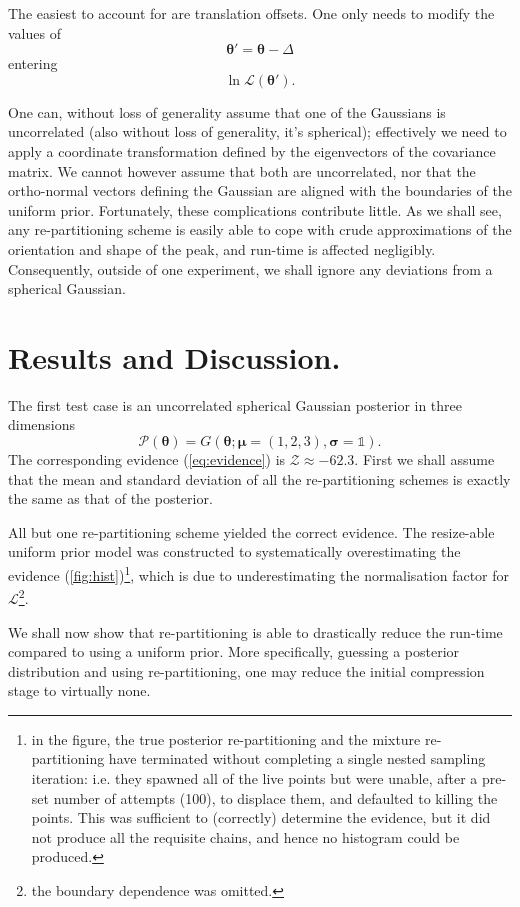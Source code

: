 \documentclass[usenatbib]{mnras}
\begin{document}
The easiest to account for are translation offsets. One only needs
to modify the values of \[\bm{\theta}' = \bm{\theta} - \Delta\] entering
\[\ln \mathcal{L}(\bm{\theta}').\]

One can, without loss of generality assume that one of the
Gaussians is uncorrelated (also without loss of generality, it's
spherical); effectively we need to apply a coordinate
transformation defined by the eigenvectors of the covariance
matrix. We cannot however assume that both are uncorrelated, nor
that the ortho-normal vectors defining the Gaussian are aligned
with the boundaries of the uniform prior. Fortunately, these
complications contribute little. As we shall see, any
re-partitioning scheme is easily able to cope with crude
approximations of the orientation and shape of the peak, and
run-time is affected negligibly. Consequently, outside of one
experiment, we shall ignore any deviations from a spherical
Gaussian.


\section{Results and Discussion.}
\label{sec:orgec40726}
The first test case is an uncorrelated spherical Gaussian posterior
in three dimensions \[\mathcal{P}(\bm{\theta}) = G(\bm{\theta}; \bm{\mu} =
  (1,2,3),\bm{\sigma} = \mathds{1}).\] The corresponding evidence
(\autoref{eq:evidence}) is \(\mathcal{Z}\approx-62.3\). First we shall
assume that the mean and standard deviation of all the
re-partitioning schemes is exactly the same as that of the
posterior.

All but one re-partitioning scheme yielded the correct evidence. The
resize-able uniform prior model was constructed to systematically
overestimating the evidence (\autoref{fig:hist})\footnote{in the figure,
the true posterior re-partitioning and the mixture re-partitioning
have terminated without completing a single nested sampling
iteration: i.e. they spawned all of the live points but were unable,
after a pre-set number of attempts (100), to displace them, and
defaulted to killing the points. This was sufficient to (correctly)
determine the evidence, but it did not produce all the requisite
chains, and hence no histogram could be produced.}, which is due to
underestimating the normalisation factor for
\(\mathcal{L}\)\footnote{the boundary dependence was omitted.}.


We shall now show that re-partitioning is able to drastically reduce
the run-time compared to using a uniform prior. More specifically,
guessing a posterior distribution and using re-partitioning, one may
reduce the initial compression stage to virtually none.
\end{document}
